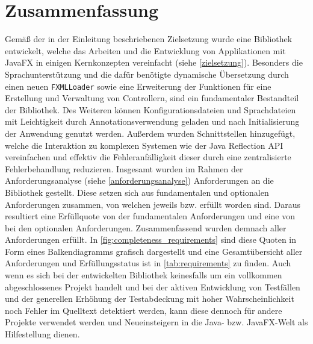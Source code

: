 \section{Zusammenfassung}
\label{zusammenfassung}
Gemäß der in der Einleitung beschriebenen Zielsetzung wurde eine Bibliothek entwickelt, welche das Arbeiten und die Entwicklung von Applikationen mit JavaFX in einigen Kernkonzepten vereinfacht (siehe \autoref{zielsetzung}). Besonders die Sprachunterstützung und die dafür benötigte dynamische Übersetzung durch einen neuen \texttt{FXMLLoader} sowie eine Erweiterung der Funktionen für eine Erstellung und Verwaltung von Controllern, sind ein fundamentaler Bestandteil der Bibliothek. Des Weiteren können Konfigurationsdateien und Sprachdateien mit Leichtigkeit durch Annotationsverwendung geladen und nach Initialisierung der Anwendung genutzt werden. Außerdem wurden Schnittstellen hinzugefügt, welche die Interaktion zu komplexen Systemen wie der Java Reflection API vereinfachen und effektiv die Fehleranfälligkeit dieser durch eine zentralisierte Fehlerbehandlung reduzieren. Insgesamt wurden im Rahmen der Anforderungsanalyse (siehe \autoref{anforderungsanalyse}) \thereq{} Anforderungen an die Bibliothek gestellt. Diese setzen sich aus \thereqFunAmount{} fundamentalen und \NUMBERFORMAT{\thereqOptAmount{}} optionalen Anforderungen zusammen, von welchen jeweils \thereqFunCompleted{} bzw. \NUMBERFORMAT{\thereqOptCompleted{}} erfüllt worden sind. Daraus resultiert eine Erfüllquote von \CalculatePercentage{\thereqFunCompleted}{\thereqFunAmount} der fundamentalen Anforderungen und eine von \CalculatePercentage{\thereqOptCompleted}{\thereqOptAmount} bei den optionalen Anforderungen. Zusammenfassend wurden demnach \CalculatePercentage{\thereqTotalCompleted}{\thereq} aller Anforderungen erfüllt. In \autoref{fig:completeness_requirements} sind diese Quoten in Form eines Balkendiagramms grafisch dargestellt und eine Gesamtübersicht aller Anforderungen und Erfüllungsstatus ist in \autoref{tab:requirements} zu finden. Auch wenn es sich bei der entwickelten Bibliothek keinesfalls um ein vollkommen abgeschlossenes Projekt handelt und bei der aktiven Entwicklung von Testfällen und der generellen Erhöhung der Testabdeckung mit hoher Wahrscheinlichkeit noch Fehler im Quelltext detektiert werden, kann diese dennoch für andere Projekte verwendet werden und Neueinsteigern in die Java- bzw. JavaFX-Welt als Hilfestellung dienen.
